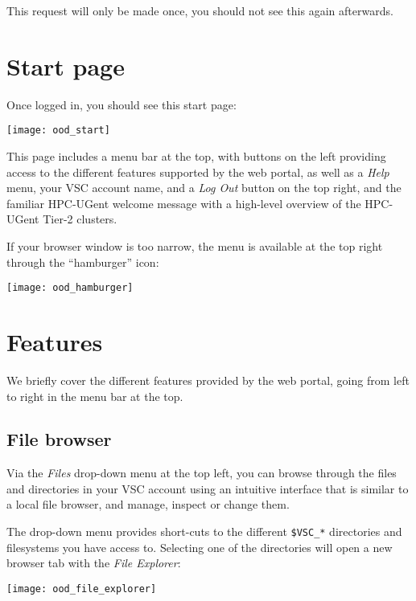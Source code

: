
This request will only be made once, you should not see this again afterwards.

\section{Start page}

Once logged in, you should see this start page:

\begin{center}
    \texttt{[image: ood\_start]}
\end{center}

This page includes a menu bar at the top, with buttons on the left providing access to the different features supported
by the web portal, as well as a \emph{Help} menu, your VSC account name, and a \emph{Log Out} button on the top right,
and the familiar HPC-UGent welcome message with a high-level overview of the HPC-UGent Tier-2 clusters.

If your browser window is too narrow, the menu is available at the top right through the ``hamburger'' icon:

\begin{center}
    \texttt{[image: ood\_hamburger]}
\end{center}


\section{Features}

We briefly cover the different features provided by the web portal, going from left to right
in the menu bar at the top.

\subsection{File browser}

Via the \emph{Files} drop-down menu at the top left, you can browse through the files and directories in your
VSC account using an intuitive interface that is similar to a local file browser, and manage, inspect or change them.

The drop-down menu provides
short-cuts to the different \lstinline|$VSC_*| directories and filesystems you have access to.
Selecting one of the directories will open a new browser tab with the \emph{File Explorer}:

\begin{center}
    \texttt{[image: ood\_file\_explorer]}
\end{center}

